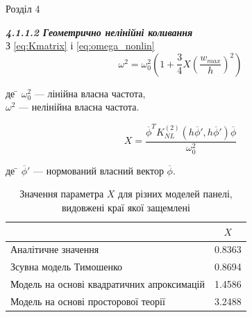 \documentclass[8pt]{beamer}
\numberwithin{figure}{section}
\numberwithin{equation}{section}
\numberwithin{table}{section}
\begin{document}
\begin{frame}{Розділ 4}

\textbf{\textit{4.1.1.2 Геометрично нелінійні коливання}}
\\
\vspace{1em}
З \eqref{eq:Kmatrix} і \eqref{eq:omega_nonlin}
\begin{equation}
\omega^2=\omega_0^2\left(1+\frac{3}{4}X\left(\frac{w_{max}}{h}\right)^2\right)
\end{equation}

\begin{tabbing}
де \= $\omega_0^2$ --- лінійна власна частота,\\
\> $\omega^2$ --- нелінійна власна частота.
\end{tabbing}

\begin{equation}
X=\frac{\overline{\phi}^T K_{NL}^{(2)}\left( h\overline{\phi}',h\overline{\phi}' \right) \overline{\phi}}{\omega_0^2}
\end{equation}

\begin{tabbing}
де \= $\overline{\phi}'$ --- нормований власний вектор $\overline{\phi}$.
\end{tabbing}


%
\begin{table}[h!]
\caption{Значення параметра $X$ для різних моделей панелі, видовжені краї якої защемлені}
\centering
 \begin{tabular}{| l | c |} 
 \hline
 & $X$ \\ 
 \hline
 Аналітичне значення\footnotemark & 0.8363 \\ 
 \hline
 Зсувна модель Тимошенко & 0.8694 \\ 
 \hline
 Модель на основі квадратичних апроксимацій & 1.4586 \\ 
 \hline
 Модель на основі просторової теорії & 3.2488 \\
 \hline
\end{tabular}
\end{table}



\end{frame}
\end{document}
